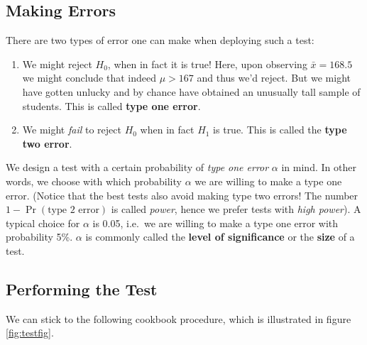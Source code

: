 \documentclass[]{book}
\providecommand{\tightlist}{%
  \setlength{\itemsep}{0pt}\setlength{\parskip}{0pt}}
\begin{document}
\subsection{Making Errors}\label{making-errors}

There are two types of error one can make when deploying such a test:

\begin{enumerate}
\def\labelenumi{\arabic{enumi}.}
\tightlist
\item
  We might reject \(H_0\), when in fact it is true! Here, upon observing
  \(\bar{x} = 168.5\) we might conclude that indeed \(\mu > 167\) and
  thus we'd reject. But we might have gotten unlucky and by chance have
  obtained an unusually tall sample of students. This is called
  \textbf{type one error}.
\item
  We might \emph{fail} to reject \(H_0\) when in fact \(H_1\) is true.
  This is called the \textbf{type two error}.
\end{enumerate}

We design a test with a certain probability of \emph{type one error}
\(\alpha\) in mind. In other words, we choose with which probability
\(\alpha\) we are willing to make a type one error. (Notice that the
best tests also avoid making type two errors! The number
\(1-\Pr(\text{type 2 error})\) is called \emph{power}, hence we prefer
tests with \emph{high power}). A typical choice for \(\alpha\) is 0.05,
i.e.~we are willing to make a type one error with probability 5\%.
\(\alpha\) is commonly called the \textbf{level of significance} or the
\textbf{size} of a test.

\subsection{Performing the Test}\label{performing-the-test}

We can stick to the following cookbook procedure, which is illustrated
in figure \ref{fig:testfig}.
\end{document}
